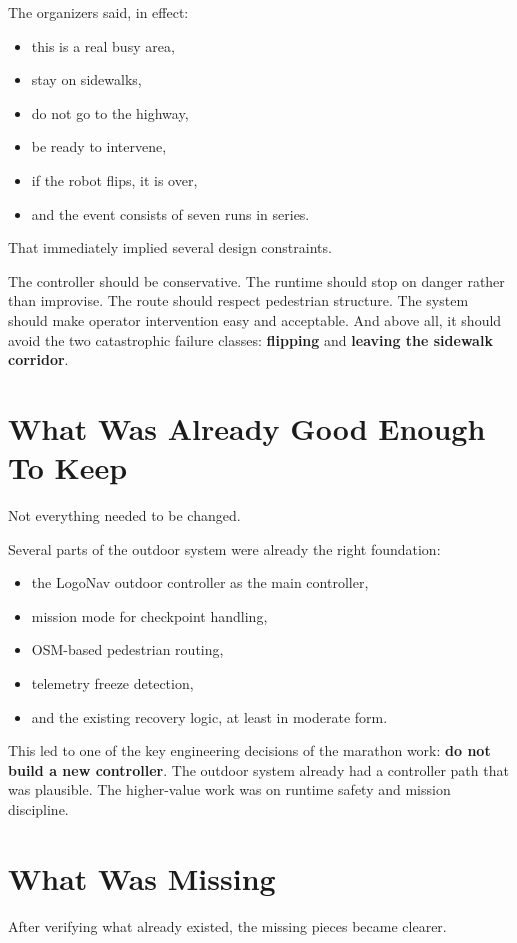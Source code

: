 \documentclass[11pt]{article}
\begin{document}
The organizers said, in effect:
\begin{itemize}[leftmargin=*]
\item this is a real busy area,
\item stay on sidewalks,
\item do not go to the highway,
\item be ready to intervene,
\item if the robot flips, it is over,
\item and the event consists of seven runs in series.
\end{itemize}

That immediately implied several design constraints.

The controller should be conservative. The runtime should stop on danger rather than improvise. The route should respect pedestrian structure. The system should make operator intervention easy and acceptable. And above all, it should avoid the two catastrophic failure classes: \textbf{flipping} and \textbf{leaving the sidewalk corridor}.

\section{What Was Already Good Enough To Keep}
Not everything needed to be changed.

Several parts of the outdoor system were already the right foundation:
\begin{itemize}[leftmargin=*]
\item the LogoNav outdoor controller as the main controller,
\item mission mode for checkpoint handling,
\item OSM-based pedestrian routing,
\item telemetry freeze detection,
\item and the existing recovery logic, at least in moderate form.
\end{itemize}

This led to one of the key engineering decisions of the marathon work: \textbf{do not build a new controller}. The outdoor system already had a controller path that was plausible. The higher-value work was on runtime safety and mission discipline.

\section{What Was Missing}
After verifying what already existed, the missing pieces became clearer.
\end{document}
